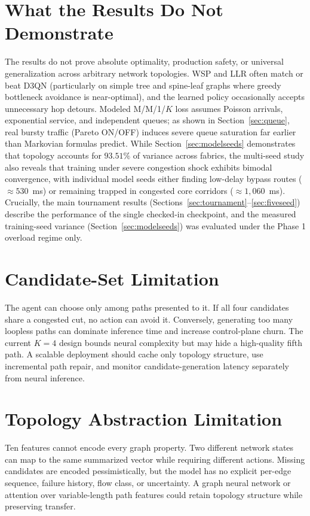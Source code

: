 \documentclass[12pt,a4paper,oneside]{report}
\begin{document}
\section{What the Results Do Not Demonstrate}
The results do not prove absolute optimality, production safety, or universal generalization across arbitrary network topologies. WSP and LLR often match or beat D3QN (particularly on simple tree and spine-leaf graphs where greedy bottleneck avoidance is near-optimal), and the learned policy occasionally accepts unnecessary hop detours. Modeled M/M/1/$K$ loss assumes Poisson arrivals, exponential service, and independent queues; as shown in Section~\ref{sec:queue}, real bursty traffic (Pareto ON/OFF) induces severe queue saturation far earlier than Markovian formulas predict. While Section~\ref{sec:modelseeds} demonstrates that topology accounts for $93.51\%$ of variance across fabrics, the multi-seed study also reveals that training under severe congestion shock exhibits bimodal convergence, with individual model seeds either finding low-delay bypass routes ($\approx 530$~ms) or remaining trapped in congested core corridors ($\approx 1,060$~ms). Crucially, the main tournament results (Sections~\ref{sec:tournament}--\ref{sec:fiveseed}) describe the performance of the single checked-in checkpoint, and the measured training-seed variance (Section~\ref{sec:modelseeds}) was evaluated under the Phase 1 overload regime only.

\section{Candidate-Set Limitation}
The agent can choose only among paths presented to it. If all four candidates share a congested cut, no action can avoid it. Conversely, generating too many loopless paths can dominate inference time and increase control-plane churn. The current $K=4$ design bounds neural complexity but may hide a high-quality fifth path. A scalable deployment should cache only topology structure, use incremental path repair, and monitor candidate-generation latency separately from neural inference.

\section{Topology Abstraction Limitation}
Ten features cannot encode every graph property. Two different network states can map to the same summarized vector while requiring different actions. Missing candidates are encoded pessimistically, but the model has no explicit per-edge sequence, failure history, flow class, or uncertainty. A graph neural network or attention over variable-length path features could retain topology structure while preserving transfer.
\end{document}
